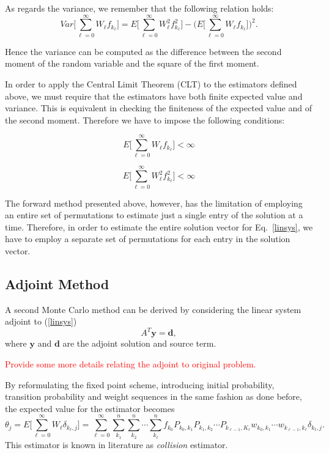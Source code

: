 As regards the variance, we remember that the following relation holds:
\begin{equation}
Var\bigg [\sum_{\ell=0}^\infty W_{\ell}
f_{k_{\ell}}\bigg]=E\bigg[\sum_{\ell=0}^\infty W_{\ell}^2
f_{k_{\ell}}^2\bigg] - \bigg (E\bigg[\sum_{\ell=0}^\infty W_{\ell}
f_{k_{\ell}}\bigg]\bigg )^2.
\label{dir_var}
\end{equation}

Hence the variance can be computed as the difference between the second
moment of the random variable and the square of the first moment.\newline

In order to apply the Central Limit Theorem (CLT) to the estimators defined
above, we must require that
the estimators have both finite expected value and variance. This is
equivalent in
checking the finiteness of the expected value and of the second moment.
Therefore we have to impose the following conditions:

\begin{equation}
 E\bigg[\sum_{\ell=0}^\infty W_{\ell} f_{k_{\ell}}\bigg]<\infty
\end{equation}

\begin{equation}
 E\bigg[\sum_{\ell=0}^\infty W_{\ell}^2
f_{k_{\ell}}^2\bigg]<\infty
\end{equation}

The forward method presented above, however, has the limitation of employing an
entire set of permutations to estimate just a single entry of
the solution at a time. Therefore, in order to estimate the entire solution
vector for Eq.~\eqref{linsys}, we have to employ a separate set of
permutations for each entry in the solution vector.

\subsection{Adjoint Method}
\label{subsec:adjoint}

A second Monte Carlo method can be derived by considering the linear system
adjoint to (\ref{linsys})
\begin{equation}
A^T\mathbf{y}=\mathbf{d},
\label{adj}
\end{equation}
where $\mathbf{y}$ and $\mathbf{d}$ are the adjoint solution and source term.

\textcolor{red}{Provide some more details relating the adjoint to original problem.}

By reformulating the fixed point scheme, introducing initial probability,
transition probability and weight
sequences in the same fashion as done before, the expected value for the
estimator becomes
\begin{equation}
\theta_j=E\bigg[\sum_{\ell=0}^\infty W_{\ell}\delta_{k_{\ell},
j}\bigg]=\sum_{\ell=0}^{\infty}\sum_{k_1}^n\sum_{k_2}^n\cdots\sum_{k_{\ell}}^n
f_{k_0}P_{k_0,k_1}P_{k_1,k_2}\cdots P_{k_{\ell-1},K_{\ell}}w_{k_0,k_1}\cdots
w_{k_{\ell-1},k_{\ell}}\delta_{k_{\ell},j}.
\label{adj_mean}
\end{equation}
This estimator is known in literature as \textit{collision} estimator.

